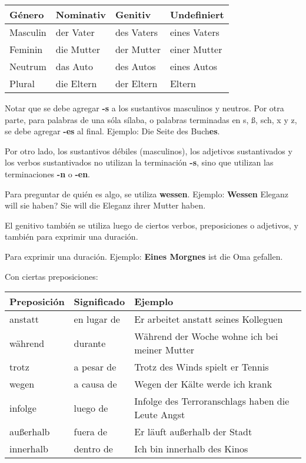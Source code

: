 \begin{tabular}{| l | l | l | l |}
\hline
\textbf{Género} & \textbf{Nominativ} & \textbf{Genitiv} & \textbf{Undefiniert}\\
\hline
Masculin & der Vater & des Vaters & eines Vaters \\
Feminin & die Mutter &  der Mutter & einer Mutter \\
Neutrum & das Auto & des Autos & eines Autos\\
Plural & die Eltern & der Eltern & Eltern \\
\hline
\end{tabular}

Notar que se debe agregar \textbf{-s} a los sustantivos masculinos y neutros. Por otra parte, para palabras de una sóla sílaba, o palabras terminadas en s, ß, sch, x y z, se debe agregar \textbf{-es} al final. Ejemplo: Die Seite des Buch\textbf{es}.

Por otro lado, los sustantivos débiles (masculinos), los adjetivos sustantivados y los verbos sustantivados no utilizan la terminación \textbf{-s}, sino que utilizan las terminaciones \textbf{-n} o \textbf{-en}. 

Para preguntar de quién es algo, se utiliza \textbf{wessen}. Ejemplo: \textbf{Wessen} Eleganz will sie haben? Sie will die Eleganz ihrer Mutter haben.

El genitivo también se utiliza luego de ciertos verbos, preposiciones o adjetivos, y también para exprimir una duración.

Para exprimir una duración. Ejemplo: \textbf{Eines Morgnes} ist die Oma gefallen.

Con ciertas preposiciones:

\begin{tabular}{| l | l | l |}
\hline
\textbf{Preposición} & \textbf{Significado} & \textbf{Ejemplo}\\
\hline
anstatt & en lugar de & Er arbeitet anstatt seines Kolleguen\\
während & durante & Während der Woche wohne ich bei meiner Mutter\\
trotz & a pesar de & Trotz des Winds spielt er Tennis\\
wegen & a causa de & Wegen der Kälte werde ich krank\\
infolge & luego de & Infolge des Terroranschlags haben die Leute Angst\\
außerhalb & fuera de & Er läuft außerhalb der Stadt\\
innerhalb & dentro de & Ich bin innerhalb des Kinos\\
\hline
\end{tabular}

